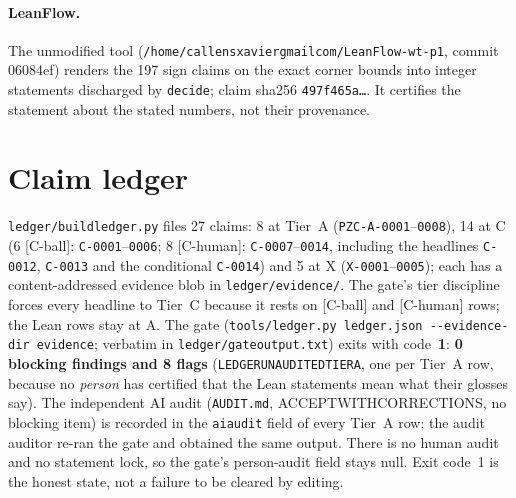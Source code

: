 \documentclass[10pt]{article}
\newcommand{\tier}[1]{\textsf{[#1]}}
\newcommand{\tCh}{\tier{C-human}}
\newcommand{\tCb}{\textcolor{blue!60!black}{\textsf{[C-ball]}}}
\newcommand{\lean}[1]{\texttt{#1}}
\renewcommand{\_}{\textunderscore\penalty0\hspace{0pt}}
\begin{document}
\paragraph{LeanFlow.} The unmodified tool (\texttt{/home/callensxavier\_gmail\_com/LeanFlow-wt-p1}, commit 06084ef) renders the 197 sign claims on the exact corner bounds into integer statements discharged by \lean{decide}; claim sha256 \texttt{497f465a\ldots}. It certifies the statement about the stated numbers, not their provenance.

\section{Claim ledger}\label{sec:ledger}
\texttt{ledger/build\_ledger.py} files 27 claims: 8 at Tier~A (\texttt{PZC-A-0001}--\texttt{0008}), 14 at C (6 \tCb: \texttt{C-0001}--\texttt{0006}; 8 \tCh: \texttt{C-0007}--\texttt{0014}, including the headlines \texttt{C-0012}, \texttt{C-0013} and the conditional \texttt{C-0014}) and 5 at X (\texttt{X-0001}--\texttt{0005}); each has a content-addressed evidence blob in \texttt{ledger/evidence/}. The gate's tier discipline forces every headline to Tier~C because it rests on \tCb{} and \tCh{} rows; the Lean rows stay at A.
The gate (\texttt{tools/ledger.py ledger.json -{}-evidence-dir evidence}; verbatim in \texttt{ledger/gate\_output.txt}) exits with code~\textbf{1}: \textbf{0 blocking findings and 8 flags} (\texttt{LEDGER\_UNAUDITED\_TIER\_A}, one per Tier~A row, because no \emph{person} has certified that the Lean statements mean what their glosses say). The independent AI audit (\texttt{AUDIT.md}, ACCEPT\_WITH\_CORRECTIONS, no blocking item) is recorded in the \texttt{ai\_audit} field of every Tier~A row; the audit auditor re-ran the gate and obtained the same output. There is no human audit and no statement lock, so the gate's person-audit field stays null. Exit code~1 is the honest state, not a failure to be cleared by editing.

\end{document}
